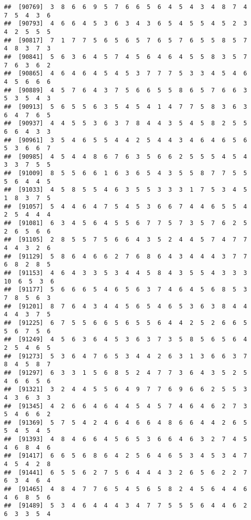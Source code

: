\documentclass[
]{book}
\begin{document}
\begin{verbatim}
##  [90769]  3  8  6  6  9  5  7  6  6  5  6  4  5  4  3  4  8  7  4  7  5  4  3  6
##  [90793]  4  6  6  4  5  3  6  3  4  3  6  5  4  5  5  4  5  2  3  4  2  5  5  5
##  [90817]  7  1  7  7  5  6  5  6  5  7  6  5  7  6  5  5  8  5  7  4  8  3  7  3
##  [90841]  5  6  3  6  4  5  7  4  5  6  4  6  4  5  5  8  3  5  7  7  6  3  6  2
##  [90865]  4  6  4  6  4  5  4  5  3  7  7  7  5  3  3  4  5  4  6  4  5  6  6  6
##  [90889]  4  5  7  6  4  3  7  5  6  6  5  5  8  6  5  7  6  6  3  5  3  5  4  3
##  [90913]  5  6  5  5  6  3  5  4  5  4  1  4  7  7  5  8  3  6  3  6  4  7  6  5
##  [90937]  4  4  5  5  3  6  3  7  8  4  4  3  5  4  5  8  2  5  5  6  6  4  3  3
##  [90961]  3  5  4  6  5  5  4  4  2  5  4  4  3  4  6  4  6  5  6  5  3  6  6  7
##  [90985]  4  5  4  4  8  6  7  6  3  5  6  6  2  5  5  5  4  5  4  3  3  7  5  5
##  [91009]  8  5  5  6  6  1  6  3  6  5  4  3  5  5  8  7  7  5  5  5  6  4  4  5
##  [91033]  4  5  8  5  5  4  6  3  5  5  3  3  3  1  7  5  3  4  5  1  8  3  7  5
##  [91057]  5  4  4  6  4  7  5  4  5  3  6  6  7  4  4  6  5  5  4  2  5  4  4  4
##  [91081]  6  3  4  5  6  4  5  5  6  7  7  5  7  3  5  7  6  2  5  2  6  5  6  6
##  [91105]  2  8  5  5  7  5  6  6  4  3  5  2  4  4  5  7  4  7  7  4  4  3  2  6
##  [91129]  5  8  6  4  6  6  2  7  6  8  6  4  3  4  4  4  3  7  7  6  8  2  8  5
##  [91153]  4  6  4  3  3  5  3  4  4  5  8  4  3  5  5  4  3  3  3 10  6  5  3  6
##  [91177]  5  6  6  6  5  4  6  5  6  3  7  4  6  4  5  6  8  5  3  7  8  5  6  3
##  [91201]  8  7  6  4  3  4  4  5  6  5  4  6  5  3  6  3  8  4  4  4  4  3  7  5
##  [91225]  6  7  5  5  6  6  5  6  5  5  6  4  4  2  5  2  6  6  5  5  6  7  5  6
##  [91249]  4  5  6  3  6  4  5  3  6  3  7  3  5  8  5  6  5  6  4  2  5  4  6  5
##  [91273]  5  3  6  4  7  6  5  3  4  4  2  6  3  1  3  6  6  3  7  8  4  5  8  7
##  [91297]  6  3  3  1  5  6  8  5  2  4  7  7  3  6  4  3  5  2  5  4  6  6  5  6
##  [91321]  3  2  4  4  5  5  6  4  9  7  7  6  9  6  6  2  5  5  3  4  3  6  3  3
##  [91345]  4  2  6  6  4  6  4  4  5  4  5  7  4  6  4  6  2  7  3  5  4  6  6  2
##  [91369]  5  7  5  4  2  4  6  4  6  6  4  8  6  6  4  4  2  6  5  5  4  5  4  5
##  [91393]  4  8  4  6  6  4  5  6  5  3  6  6  4  6  3  2  7  4  5  4  6  8  4  6
##  [91417]  6  6  5  6  8  6  4  2  5  6  4  6  5  3  4  5  3  4  7  4  5  4  2  8
##  [91441]  6  5  5  6  2  7  5  6  4  4  4  3  2  6  5  6  2  2  7  6  3  4  6  4
##  [91465]  4  8  4  7  7  6  5  4  5  6  5  8  2  4  5  6  4  4  6  4  6  8  5  6
##  [91489]  5  3  4  6  4  4  4  3  4  7  7  5  5  5  6  4  4  6  2  6  3  3  5  4

\end{verbatim}
\end{document}
